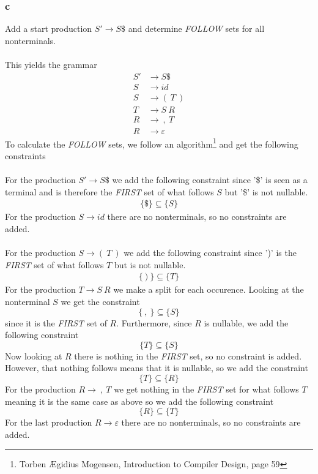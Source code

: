 \documentclass[12pt]{article}
\begin{document}
\subsubsection*{c}
Add a start production $S' \rightarrow S\$$ and determine \textit{FOLLOW} sets for all nonterminals.\\
\\
This yields the grammar
\begin{align*}
S' &\rightarrow S\$ \\
S &\rightarrow id \\
S &\rightarrow (\:T\:) \\
T &\rightarrow S\:R \\
R &\rightarrow \:,\:T \\
R &\rightarrow \varepsilon
\end{align*}
To calculate the \textit{FOLLOW} sets, we follow an algorithm\footnote{Torben Ægidius Mogensen, Introduction to Compiler Design, page 59} and get the following constraints \\
\\
For the production $S' \rightarrow S\$$ we add the following constraint since '\$' is seen as a terminal and is therefore the \textit{FIRST} set of what follows $S$ but '\$' is not nullable.
\begin{align*}
\{\$\} \subseteq \{S\}
\end{align*}
For the production $S \rightarrow id$ there are no nonterminals, so no constraints are added.\\\\
For the production $S \rightarrow (\:T\:)$ we add the following constraint since ')' is the \textit{FIRST} set of what follows $T$ but is not nullable.
\begin{align*}
\{\:)\:\} \subseteq \{T\}
\end{align*}
For the production $T \rightarrow S\:R$ we make a split for each occurence. Looking at the nonterminal $S$ we get the constraint
$$ \{\:,\:\} \subseteq \{S\} $$
since it is the \textit{FIRST} set of $R$. Furthermore, since $R$ is nullable, we add the following constraint
$$ \{T\} \subseteq \{S\} $$
Now looking at $R$ there is nothing in the \textit{FIRST} set, so no constraint is added. However, that nothing follows means that it is nullable, so we add the constraint
$$ \{T\} \subseteq \{R\} $$
For the production $R \rightarrow \:,\:T$ we get nothing in the \textit{FIRST} set for what follows $T$ meaning it is the same case as above so we add the following constraint
$$ \{R\} \subseteq \{T\} $$
For the last production $R \rightarrow \varepsilon$ there are no nonterminals, so no constraints are added.\\
\end{document}
